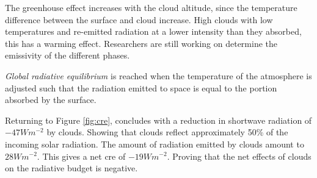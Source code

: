 The greenhouse effect increases with the cloud altitude, since the temperature difference between the surface and cloud increase. High clouds with low temperatures and  re-emitted radiation at a lower intensity than they absorbed, this has a warming effect. Researchers are still working on determine the emissivity of the different phases. 




\textit{Global radiative equilibrium} is reached when the temperature of the atmosphere is adjusted such that the radiation emitted to space is equal to the portion absorbed by the surface.

Returning to Figure \ref{fig:cre}, \citeauthor{Wild2019TheModels} concludes with a reduction in shortwave radiation of $-47Wm^{-2}$ by clouds. Showing that clouds reflect approximately 50\% of the incoming solar radiation. The amount of radiation emitted by clouds amount to $28Wm^{-2}$. This gives a net \acrshort{cre} of $-19Wm^{-2}$. Proving that the net effects of clouds on the radiative budget is negative. 

